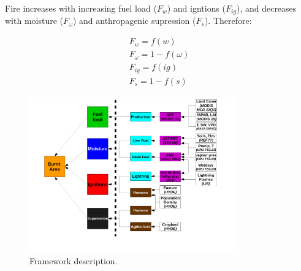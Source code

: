 Fire increases with increasing fuel load ($F_w$) and igntions ($F_{ig}$), and decreases with moisture ($F_{\omega}$) and anthropagenic supression ($F_s$). Therefore:

\begin{equation}
    \begin{split}
        F_{w} = f(w) \\
        F_{\omega} = 1 - f(\omega) \\
        F_{ig} = f(ig) \\
        F_{s} = 1- f(s)
    \end{split}
    \label{equ:LimFIRE.x}
\end{equation}

\begin{figure}[!ht]
  \centering
    \includegraphics[width=0.8\textwidth]{diagrams/Model_schematic.pdf}
  \caption{Framework description.}
\end{figure}
